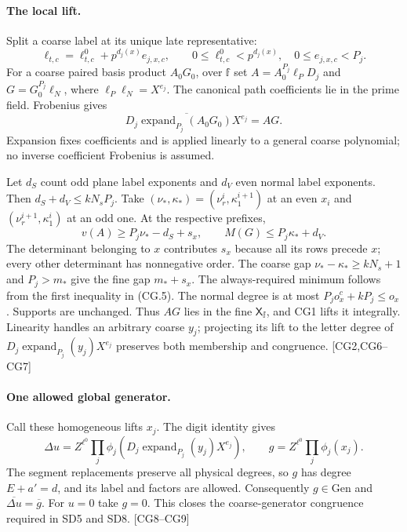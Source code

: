 \paragraph{The local lift.}
Split a coarse label at its unique late representative:
\[
 \ell_{t,c}=\ell^0_{t,c}+p^{d_j(x)}e_{j,x,c},\qquad
 0\le\ell^0_{t,c}<p^{d_j(x)},\quad0\le e_{j,x,c}<P_j. \tag{CG.6}
\]
For a coarse paired basis product $A_0G_0$, over $\mathbb f$ set
$A=A_0^{P_j}\ell_P D_j$ and $G=G_0^{P_j}\ell_N$, where
$\ell_P\ell_N=X^{e_j}$.
The canonical path coefficients lie in the prime field. Frobenius gives
\[
 \overline{D_j\operatorname{expand}_{P_j}(A_0G_0)X^{e_j}}=AG.
\]
Expansion fixes coefficients and is applied linearly to a general
coarse polynomial; no inverse coefficient Frobenius is assumed.

Let $d_S$ count odd plane label exponents and $d_V$ even normal label
exponents. Then $d_S+d_V\le kN_sP_j$. Take
$(\nu_*,\kappa_*)=(\nu^i_r,\kappa^{i+1}_1)$ at an even $x_i$ and
$(\nu^{i+1}_r,\kappa^i_1)$ at an odd one. At the respective prefixes,
\[
 v(A)\ge P_j\nu_*-d_S+s_x,\qquad
 M(G)\le P_j\kappa_*+d_V.                            \tag{CG.7}
\]
The determinant belonging to $x$ contributes $s_x$ because all its
rows precede $x$; every other determinant has nonnegative order.
The coarse gap $\nu_*-\kappa_*\ge kN_s+1$ and $P_j>m_*$
give the fine gap $m_*+s_x$. The always-required minimum follows from
the first inequality in (CG.5). The normal degree is at most
$P_jo^c_x+kP_j\le o_x$. Supports are unchanged. Thus $AG$ lies in the
fine $\mathsf X_{\mathbb f}$, and CG1 lifts it integrally.
Linearity handles an arbitrary coarse $y_j$; projecting its lift to
the letter degree of $D_j\operatorname{expand}_{P_j}(y_j)X^{e_j}$
preserves both membership and congruence. \textsf{[CG2,CG6--CG7]}

\paragraph{One allowed global generator.}
Call these homogeneous lifts $x_j$. The digit identity gives
\[
 \Delta u=Z^{\ell^0}\prod_j\phi_j
       (D_j\operatorname{expand}_{P_j}(y_j)X^{e_j}),
 \qquad g=Z^{\ell^0}\prod_j\phi_j(x_j).               \tag{CG.8}
\]
The segment replacements preserve all physical degrees, so $g$ has
degree $E+a'=d$, and its label and factors are allowed. Consequently
$g\in\mathrm{Gen}$ and $\overline{\Delta u}=\overline g$.
For $u=0$ take $g=0$. This closes the coarse-generator congruence
required in SD5 and SD8. \textsf{[CG8--CG9]}
